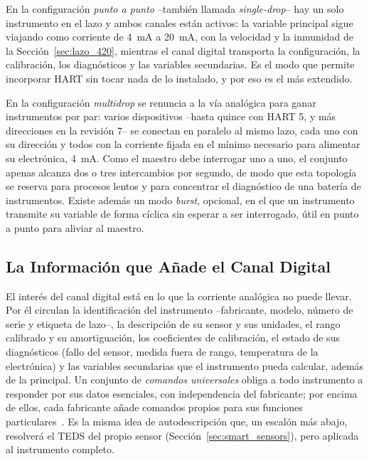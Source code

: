 En la configuración \emph{punto a punto} --también llamada \emph{single-drop}-- hay un solo instrumento en el lazo y ambos canales están activos: la variable principal sigue viajando como corriente de \SI{4}{\milli\ampere} a \SI{20}{\milli\ampere}, con la velocidad y la inmunidad de la Sección~\ref{sec:lazo_420}, mientras el canal digital transporta la configuración, la calibración, los diagnósticos y las variables secundarias. Es el modo que permite incorporar HART sin tocar nada de lo instalado, y por eso es el más extendido.

En la configuración \emph{multidrop} se renuncia a la vía analógica para ganar instrumentos por par: varios dispositivos --hasta quince con HART 5, y más direcciones en la revisión 7-- se conectan en paralelo al mismo lazo, cada uno con su dirección y todos con la corriente fijada en el mínimo necesario para alimentar su electrónica, \SI{4}{\milli\ampere}. Como el maestro debe interrogar uno a uno, el conjunto apenas alcanza dos o tres intercambios por segundo, de modo que esta topología se reserva para procesos lentos y para concentrar el diagnóstico de una batería de instrumentos. Existe además un modo \emph{burst}, opcional, en el que un instrumento transmite su variable de forma cíclica sin esperar a ser interrogado, útil en punto a punto para aliviar al maestro.


\subsection{La Información que Añade el Canal Digital}\label{sub:info_hart}

El interés del canal digital está en lo que la corriente analógica no puede llevar. Por él circulan la identificación del instrumento --fabricante, modelo, número de serie y etiqueta de lazo--, la descripción de su sensor y sus unidades, el rango calibrado y su amortiguación, los coeficientes de calibración, el estado de sus diagnósticos (fallo del sensor, medida fuera de rango, temperatura de la electrónica) y las variables secundarias que el instrumento pueda calcular, además de la principal. Un conjunto de \emph{comandos universales} obliga a todo instrumento a responder por sus datos esenciales, con independencia del fabricante; por encima de ellos, cada fabricante añade comandos propios para sus funciones particulares~\cite{berge2002fieldbuses}. Es la misma idea de autodescripción que, un escalón más abajo, resolverá el TEDS del propio sensor (Sección~\ref{sec:smart_sensors}), pero aplicada al instrumento completo.

